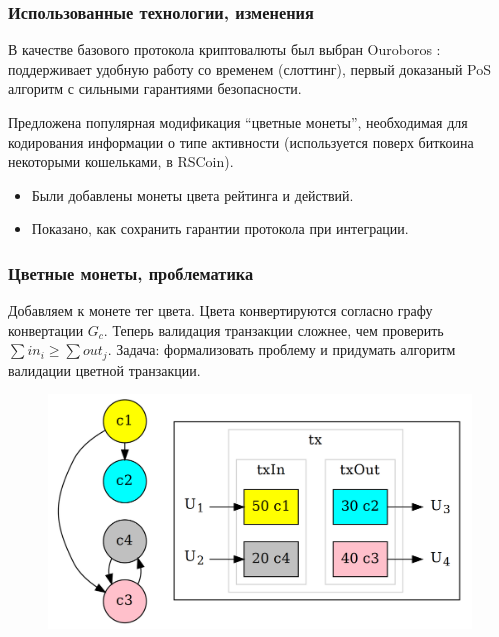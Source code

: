 \documentclass[11pt,handout,pdf,hyperref={unicode}]{beamer}
\begin{document}
\begin{frame}
  \frametitle{Использованные технологии, изменения}

  В качестве базового протокола криптовалюты был выбран Ouroboros
  \parencite{ouroboros}: поддерживает удобную работу со временем
  (слоттинг), первый доказаный PoS алгоритм с сильными гарантиями
  безопасности.

  Предложена популярная модификация ``цветные монеты'', необходимая
  для кодирования информации о типе активности (используется поверх
  биткоина некоторыми кошельками, в RSCoin).
  \begin{itemize}
  \item Были добавлены монеты цвета рейтинга и действий.
  \item Показано, как сохранить гарантии протокола при интеграции.
  \end{itemize}
\end{frame}

\begin{frame}
  \frametitle{Цветные монеты, проблематика}

  Добавляем к монете тег цвета. Цвета конвертируются согласно графу
  конвертации $G_c$. Теперь валидация транзакции сложнее, чем
  проверить $\sum{in_i} \geq \sum {out_j}$. Задача: формализовать
  проблему и придумать алгоритм валидации цветной транзакции.

  \begin{figure}[t]
  \includegraphics[scale=0.15]{pres_colortx.png}
  \centering
  \end{figure}

\end{frame}
\end{document}
